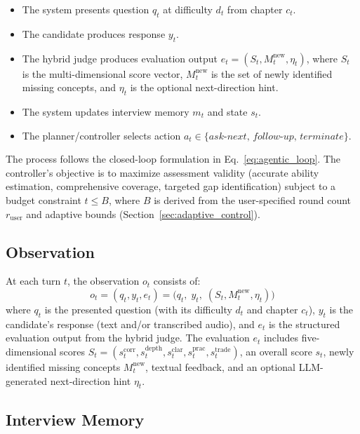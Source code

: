 ﻿\documentclass[final,3p,times,authoryear]{elsarticle}
\begin{document}
\begin{itemize}
    \item The system presents question $q_t$ at difficulty $d_t$ from chapter $c_t$.
    \item The candidate produces response $y_t$.
    \item The hybrid judge produces evaluation output $e_t = (S_t, M_t^{\text{new}}, \eta_t)$, where $S_t$ is the multi-dimensional score vector, $M_t^{\text{new}}$ is the set of newly identified missing concepts, and $\eta_t$ is the optional next-direction hint.
    \item The system updates interview memory $m_t$ and state $s_t$.
    \item The planner/controller selects action $a_t \in \{\textit{ask-next},\, \textit{follow-up},\, \textit{terminate}\}$.
\end{itemize}

The process follows the closed-loop formulation in Eq.~\eqref{eq:agentic_loop}. The controller's objective is to maximize assessment validity (accurate ability estimation, comprehensive coverage, targeted gap identification) subject to a budget constraint $t \leq B$, where $B$ is derived from the user-specified round count $r_{\text{user}}$ and adaptive bounds (Section~\ref{sec:adaptive_control}).

\subsection{Observation}
\label{sec:observation}

\noindent At each turn $t$, the observation $o_t$ consists of:
\begin{equation}
o_t = (q_t, y_t, e_t) = \bigl(q_t,\; y_t,\; (S_t, M_t^{\text{new}}, \eta_t)\bigr)
\end{equation}
where $q_t$ is the presented question (with its difficulty $d_t$ and chapter $c_t$), $y_t$ is the candidate's response (text and/or transcribed audio), and $e_t$ is the structured evaluation output from the hybrid judge. The evaluation $e_t$ includes five-dimensional scores $S_t = (s_t^{\text{corr}}, s_t^{\text{depth}}, s_t^{\text{clar}}, s_t^{\text{prac}}, s_t^{\text{trade}})$, an overall score $s_t$, newly identified missing concepts $M_t^{\text{new}}$, textual feedback, and an optional LLM-generated next-direction hint $\eta_t$.

\subsection{Interview Memory}
\label{sec:memory}
\end{document}
